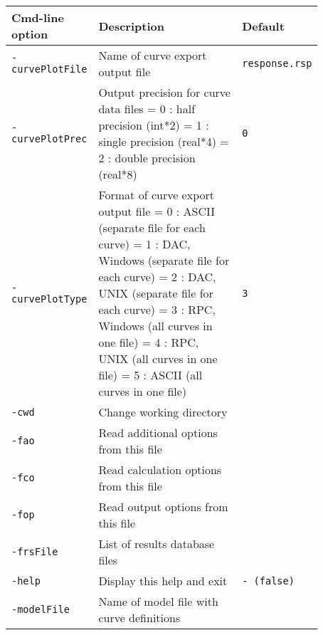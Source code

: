 \noindent
\begin{threeparttable}[b]
\footnotesize
\begin{tabular}{|>{\raggedright} p{0.23\linewidth}| p{0.48\linewidth}| p{0.16\linewidth}|}
  \hline
  \rowcolor[HTML]{EFEFEF}
  \rule{0pt}{15pt}Cmd-line option & Description & Default  \\
  \hline\hline
  \texttt{-curvePlotFile}  &   Name of curve export output file & \texttt{response.rsp}  \\
  \hline
  \texttt{-curvePlotPrec}  &   Output precision for curve data files\newline
                               = 0 : half precision (int*2)\newline
                               = 1 : single precision (real*4)\newline
                               = 2 : double precision (real*8)  & \texttt{0\tnote{1}}  \\
  \hline
  \texttt{-curvePlotType}  &   Format of curve export output file\newline
                               = 0 : ASCII (separate file for each curve)\newline
                               = 1 : DAC, Windows (separate file for each curve)\newline
                               = 2 : DAC, UNIX (separate file for each curve)\newline
                               = 3 : RPC, Windows (all curves in one file)\newline
                               = 4 : RPC, UNIX (all curves in one file)\newline
                               = 5 : ASCII (all curves in one file)  & \texttt{3}  \\
  \hline
  \texttt{-cwd}  &   Change working directory & \\
  \hline
  \texttt{-fao}  &   Read additional options from this file & \\
  \hline
  \texttt{-fco}  &   Read calculation options from this file & \\
  \hline
  \texttt{-fop}  &   Read output options from this file & \\
  \hline
  \texttt{-frsFile}  &   List of results database files & \\
  \hline
  \texttt{-help}     &   Display this help and exit & \texttt{- (false)}  \\
  \hline
  \texttt{-modelFile}    &   Name of model file with curve definitions & \\

\end{tabular}
\end{threeparttable}
